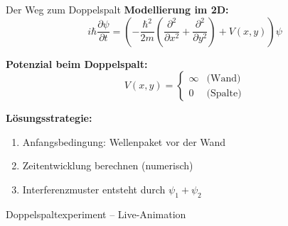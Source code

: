
\begin{frame}{Der Weg zum Doppelspalt}
    \textbf{Modellierung im 2D:}
    \[
        i\hbar\frac{\partial \psi}{\partial t} = \left(-\frac{\hbar^2}{2m}(\frac{\partial^2}{\partial x^2} + \frac{\partial^2}{\partial y^2}) + V(x,y)\right)\psi
    \]

    \textbf{Potenzial beim Doppelspalt:}
    \[
        V(x,y) = \begin{cases}
                     \infty & \text{(Wand)} \\
                     0 & \text{(Spalte)}
        \end{cases}
    \]

    \textbf{Lösungsstrategie:}
    \begin{enumerate}
        \item Anfangsbedingung: Wellenpaket vor der Wand
        \item Zeitentwicklung berechnen (numerisch)
        \item Interferenzmuster entsteht durch $\psi_1 + \psi_2$
    \end{enumerate}
\end{frame}


\begin{frame}{Doppelspaltexperiment – Live-Animation}
    \centering



\end{frame}
